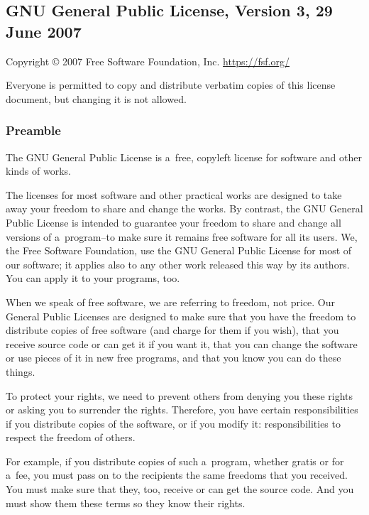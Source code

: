 \documentclass[a4paper, 11pt, twoside]{article}
\begin{document}
\begingroup
\fontsize{7pt}{8pt}
\selectfont

\subsection{GNU General Public License, Version 3, 29 June 2007}

Copyright © 2007 Free Software Foundation, Inc. \url{https://fsf.org/}

Everyone is permitted to copy and distribute verbatim copies of this license document, but changing it is not allowed.

\subsubsection{Preamble}

The GNU General Public License is a~free, copyleft license for software and other kinds of works.

The licenses for most software and other practical works are designed to take away your freedom to share and change the works. By contrast, the GNU General Public License is intended to guarantee your freedom to share and change all versions of a~program--to make sure it remains free software for all its users. We, the Free Software Foundation, use the GNU General Public License for most of our software; it applies also to any other work released this way by its authors. You can apply it to your programs, too.

When we speak of free software, we are referring to freedom, not price. Our General Public Licenses are designed to make sure that you have the freedom to distribute copies of free software (and charge for them if you wish), that you receive source code or can get it if you want it, that you can change the software or use pieces of it in new free programs, and that you know you can do these things.

To protect your rights, we need to prevent others from denying you these rights or asking you to surrender the rights. Therefore, you have certain responsibilities if you distribute copies of the software, or if you modify it: responsibilities to respect the freedom of others.

For example, if you distribute copies of such a~program, whether gratis or for a~fee, you must pass on to the recipients the same freedoms that you received. You must make sure that they, too, receive or can get the source code. And you must show them these terms so they know their rights.
\end{document}
